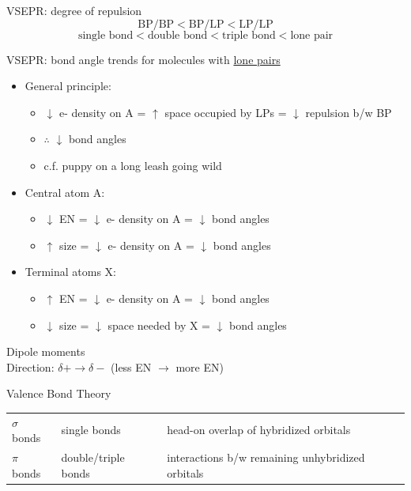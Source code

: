 \documentclass[10pt,landscape]{article}
\newcommand{\extraline}{\vspace{1em}}
\newcommand{\tableindent}{\hspace{1.5em}}
\begin{document}
\begin{multicols}{3}
VSEPR: degree of repulsion
\[ \text{BP/BP} < \text{BP/LP} < \text{LP/LP} \]
\[ \text{single bond} < \text{double bond} < \text{triple bond} < \text{lone pair} \]

VSEPR: bond angle trends for molecules with \underline{lone pairs}
\begin{itemize}
\item General principle: 
	\begin{itemize}
		\item  $\downarrow$ e- density on A = $\uparrow$ space occupied by LPs = $\downarrow$ repulsion b/w BP 
		\item $\therefore$ $\downarrow$ bond angles
		\item c.f. puppy on a long leash going wild
	\end{itemize}

\item Central atom A: 
	\begin{itemize}
		\item $\downarrow$ EN  = $\downarrow$ e- density on A = $\downarrow$ bond angles
		\item $\uparrow$ size =  $\downarrow$ e- density on A = $\downarrow$ bond angles
	\end{itemize}

\item Terminal atoms X: 
	\begin{itemize}
		\item $\uparrow$ EN  = $\downarrow$ e- density on A = $\downarrow$ bond angles
		\item $\downarrow$ size = $\downarrow$ space needed by X = $\downarrow$ bond angles
	\end{itemize}
\end{itemize}

Dipole moments \\
\tableindent Direction: $\delta + \rightarrow \delta -$ (less EN $\rightarrow$ more EN) 
\extraline

Valence Bond Theory

\begin{tabular}{@{\tableindent}lp{16mm}p{42mm}@{}}
$\sigma$ bonds & single bonds & head-on overlap of hybridized orbitals \\
$\pi$ bonds & double/triple bonds & interactions b/w  remaining unhybridized orbitals \\
\end{tabular}
\extraline


\end{multicols}
\end{document}
